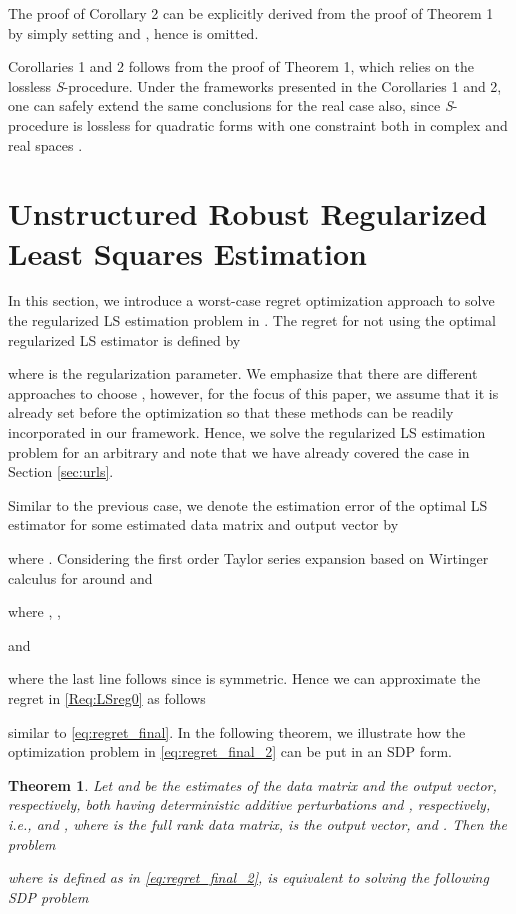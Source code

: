 \documentclass[review,sort&compress]{elsarticle}
\newtheorem{thm}{Theorem}
\begin{document}
\begin{poc2}
The proof of Corollary 2 can be explicitly derived from the proof of Theorem 1 by simply setting  and , hence is omitted. \hfill 
\end{poc2}

\begin{rmk}
Corollaries 1 and 2 follows from the proof of Theorem 1, which relies on the lossless {\em S}-procedure. Under the frameworks presented in the Corollaries 1 and 2, one can safely extend the same conclusions for the real case also, since {\em S}-procedure is lossless for quadratic forms with one constraint both in complex and real spaces \cite{huang1,huang2}.
\end{rmk}

\section{Unstructured Robust Regularized Least Squares Estimation} \label{sec:urrls}
In this section, we introduce a worst-case regret optimization approach to solve the regularized LS estimation problem in \cite{est2}. The regret for not using the optimal regularized LS estimator is defined by

where  is the regularization parameter. We emphasize that there are different approaches to choose , however, for the focus of this paper, we assume that it is already set before the optimization so that these methods can be readily incorporated in our framework. Hence, we solve the regularized LS estimation problem for an arbitrary  and note that we have already covered the  case in Section \ref{sec:urls}.

Similar to the previous case, we denote the estimation error of the optimal LS estimator for some estimated data matrix  and output vector  by

where . Considering the first order Taylor series expansion based on Wirtinger calculus \cite{graham} for  around  and 

where , ,

and

where the last line follows since  is symmetric. Hence we can approximate the regret in \eqref{Req:LSreg0} as follows

similar to \eqref{eq:regret_final}. In the following theorem, we illustrate how the optimization problem in \eqref{eq:regret_final_2} can be put in an SDP form.

\begin{thm}\label{thm2}
Let  and  be the estimates of the data matrix and the output vector, respectively, both having deterministic additive perturbations  and , respectively, i.e.,  and , where  is the full rank data matrix,  is the output vector, and . Then the problem

where  is defined as in \eqref{eq:regret_final_2}, is equivalent to solving the following SDP problem

\end{thm}
\end{document}
